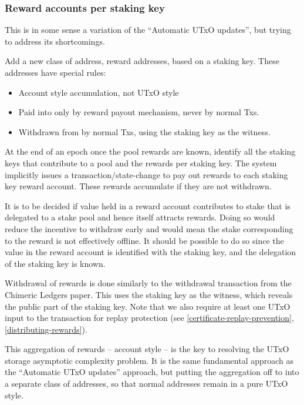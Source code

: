 \documentclass[11pt,a4paper]{article}
\begin{document}
\subsubsection{Reward accounts per staking key}
\label{reward-accounts-per-stake-key}

This is in some sense a variation of the ``Automatic UTxO updates'', but
trying to address its shortcomings.

Add a new class of address, reward addresses, based on a staking key.
These addresses have special rules:

\begin{itemize}
\item
  Account style accumulation, not UTxO style
\item
  Paid into only by reward payout mechanism, never by normal Txs.
\item
  Withdrawn from by normal Txs, using the staking key as the witness.
\end{itemize}

At the end of an epoch once the pool rewards are known, identify all the
staking keys that contribute to a pool and the rewards per staking key. The
system implicitly issues a transaction/state-change to pay out rewards
to each staking key reward account. These rewards accumulate if they are
not withdrawn.

It is to be decided if value held in a reward account contributes to
stake that is delegated to a stake pool and hence itself attracts
rewards. Doing so would reduce the incentive to withdraw early and would
mean the stake corresponding to the reward is not effectively offline.
It should be possible to do so since the value in the reward account is
identified with the staking key, and the delegation of the staking key is
known.

Withdrawal of rewards is done similarly to the withdrawal transaction from the
Chimeric Ledgers paper. This uses the staking key as the witness, which reveals
the public part of the staking key. Note that we also require at least one UTxO
input to the transaction for replay protection (see
\cref{certificate-replay-prevention}, \cref{distributing-rewards}).

This aggregation of rewards -- account style -- is the key to resolving
the UTxO storage asymptotic complexity problem. It is the same
fundamental approach as the ``Automatic UTxO updates'' approach, but
putting the aggregation off to into a separate class of addresses, so
that normal addresses remain in a pure UTxO style.
\end{document}

